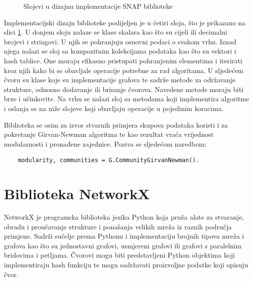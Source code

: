 \begin{figure}
	\caption{Slojevi u dizajnu implementacije SNAP biblioteke \cite{leskovec2016snap}}
	\label{fig:SNAP_design}
\end{figure}

Implementacijski dizajn biblioteke podijeljen je u četiri sloja, što je prikazano na slici \ref{fig:SNAP_design}. U donjem sloju nalaze se klase skalara kao što su cijeli ili decimalni brojevi i stringovi. U njih se pohranjuju osnovni podaci o svakom vrhu. Iznad njega nalazi se sloj sa kompozitnim kolekcijama podataka kao što su vektori i hash tablice. One moraju efikasno pristupati pohranjenim elementima i iterirati kroz njih kako bi se obavljale operacije potrebne za rad algoritama. U sljedećem čvoru su klase koje su implementacije grafova te sadrže metode za održavanje strukture, odnosno dodavanje ili brisanje čvorova. Navedene metode moraju biti brze i učinkovite. Na vrhu se nalazi sloj sa metodama koji implementira algoritme i oslanja se na niže slojeve koji obavljaju operacije u pojedinim koracima.

Biblioteka se osim za izvor stvarnih primjera skupova podataka koristi i za pokretanje Girvan-Newman algoritma te kao rezultat vraća vrijednost modularnosti i pronađene zajednice. Poziva se sljedećom naredbom:
\begin{verbatim}
	modularity, communities = G.CommunityGirvanNewman().
\end{verbatim} 



\section{Biblioteka NetworkX}
NetworkX \cite{SciPyProceedings_11} je programska biblioteka jezika Python koja pruža alate za stvaranje, obradu i proučavanje strukture i ponašanja velikih mreža iz raznih područja primjene. Sadrži sučelje prema Pythonu i implementaciju brojnih tipova mreža i grafova kao što su jednostavni grafovi, usmjereni grafovi ili grafovi s paralelnim bridovima i petljama. Čvorovi mogu biti predstavljeni Python objektima koji implementiraju hash funkciju te mogu sadržavati proizvoljne podatke koji opisuju čvor.


